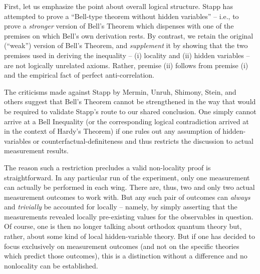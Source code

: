 \documentclass[aps,prc,onecolumn,12pt,nofootinbib]{revtex4-2}
\begin{document}
First, let us emphasize the point about overall logical structure.
Stapp has attempted to prove a
``Bell-type theorem without hidden variables'' -- i.e., to prove a
\emph{stronger} version of Bell's Theorem which dispenses with one
of the premises on which Bell's own derivation rests.  By contrast,
we retain the original (``weak'') version of Bell's Theorem, and
\emph{supplement} it by showing that the two premises used in deriving the
inequality -- (i) locality and (ii) hidden variables -- are not
logically unrelated axioms.  Rather, premise (ii) follows from
premise (i) and the empirical fact of perfect anti-correlation.

The criticisms made against Stapp by Mermin, Unruh, Shimony, Stein,
and others suggest that Bell's Theorem cannot be
strengthened in the way that would be required to validate Stapp's
route to our shared conclusion.  One simply cannot arrive at a Bell
Inequality (or the corresponding logical contradiction arrived at in
the context of Hardy's Theorem) if one rules out any assumption of
hidden-variables or counterfactual-definiteness and thus
restricts the discussion to actual measurement results.

The reason such a restriction precludes a valid non-locality proof
is straightforward.  In any particular run
of the experiment, only one measurement can actually be performed in each
wing.  There are, thus, two and only two actual measurement outcomes
to work with.  But any such pair of outcomes can \emph{always}
and \emph{trivially} be accounted for locally -- namely, by simply
asserting that the measurements revealed locally pre-existing values
for the observables in question.  Of course, one is then no
longer talking about orthodox quantum theory but, rather, about some
kind of local hidden-variable theory.  But if one has decided to focus
exclusively on measurement outcomes (and not on the specific theories
which predict those outcomes), this is a distinction without a
difference and no nonlocality can be established.
\end{document}
